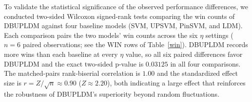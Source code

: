 \documentclass[a4paper]{cas-sc}
\begin{document}
{\color{red}To validate the statistical significance of the observed performance differences, we conducted two-sided Wilcoxon signed-rank tests comparing the win counts of DBUPLDM against four baseline models (SVM, UPSVM, PinSVM, and LDM). Each comparison pairs the two models' win counts across the six $\eta$ settings ($n=6$ paired observations; see the WIN rows of Table~\ref{win}). DBUPLDM records more wins than each baseline at every $\eta$ value, so all six paired differences favor DBUPLDM and the exact two-sided p-value is $0.03125$ in all four comparisons. The matched-pairs rank-biserial correlation is $1.00$ and the standardized effect size is $r=Z/\sqrt{n}\approx 0.90$ ($Z\approx 2.20$), both indicating a large effect that reinforces the robustness of DBUPLDM's superiority beyond random fluctuations.}




\end{document}
